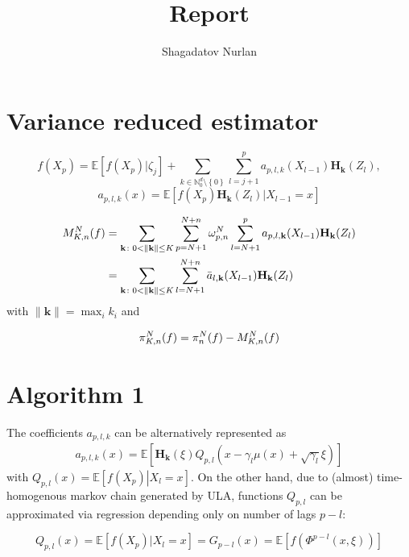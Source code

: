 \documentclass[a4paper]{article}
\title{Report}
\author{Shagadatov Nurlan}
\begin{document}
\maketitle

\section{Variance reduced estimator}

\begin{equation*}
f(X_p) = \mathbb{E} \left[ f(X_p)|\zeta_j \right] + \sum_{k\in \mathbb{N}_0^d \setminus \left\{ 0\right\}} \sum_{l=j+1}^p a_{p,l,k} (X_{l-1})\mathbf{H_k}(Z_l),
\end{equation*}
\begin{equation*}
a_{p,l,k} (x) = \mathbb{E} \left[ f(X_p) \mathbf{H_k}(Z_l) | X_{l-1} = x\right]
\end{equation*}

\begin{align}
M_{K,n}^N(f) & =\sum_{\mathbf k\colon 0<\|\mathbf{k}\|\le K}\sum_{p=N+1}^{N+n}\omega_{p,n}^{N}\sum_{l=N+1}^{p}a_{p,l,\mathbf{k}}(X_{l-1})\mathbf{H}_\mathbf{k}(Z_{l})
\label{eq:29032018a5}\\
&=\sum_{\mathbf k\colon 0<\|\mathbf{k}\|\le K}\sum_{l=N+1}^{N+n}\bar{a}_{l,\mathbf{k}}(X_{l-1})\mathbf{H}_\mathbf{k}(Z_{l})
\notag
\end{align}
with \(\|\mathbf{k}\|=\max_{i} k_i\) and


\begin{equation*}
\pi_{K,n}^N(f) = \pi_n^N(f) -  M_{K,n}^N(f) \\
\end{equation*}

\section{Algorithm 1}
The coefficients \(a_{p,l,k}\)  can be alternatively represented as 
\begin{eqnarray*}
a_{p,l,k}(x)=\mathbb{E} \left[ \mathbf{H}_\mathbf{k}( \xi ) Q_{p,l}(x - \gamma_{l} \mu (x) + \sqrt{\gamma_{l}}\xi)\right]
\end{eqnarray*}
with \(Q_{p,l}(x)=\mathbb{E}\left[\left.f(X_{p})\right|X_{l}=x\right].\) 
On the other hand, due to (almost) time-homogenous markov chain generated by ULA, functions $Q_{p,l}$ can be approximated via regression depending only on number of lags $p-l$:

\[ Q_{p,l}(x) = \mathbb{E} \left[f(X_p) | X_l = x\right] = G_{p-l}(x) = \mathbb{E} \left[ f(\varPhi ^{p-l} (x, \xi))\right]\]
\end{document}
